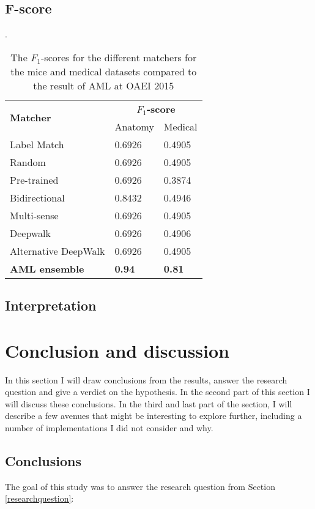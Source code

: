 \documentclass{article}
\begin{document}
  \subsection{F-score}
  \begin{table}[H]
  \caption[$F_1$]{The $F_1$-scores for the different matchers for the mice and medical datasets compared to the result of AML at OAEI 2015 \cite{oaei2015}}.
  \label{fscores}
  \begin{tabular}{l|ll}
  \multirow{2}{*}{\textbf{Matcher}} & \multicolumn{2}{c}{\textbf{$F_1$-score}} \\
  & Anatomy & Medical\\
  \hline
  Label Match & 0.6926 & 0.4905 \\
  Random & 0.6926 & 0.4905 \\
  Pre-trained & 0.6926 & 0.3874 \\
  Bidirectional & 0.8432 & 0.4946 \\
  Multi-sense & 0.6926 & 0.4905 \\
  Deepwalk & 0.6926 & 0.4906 \\
  Alternative DeepWalk & 0.6926 & 0.4905 \\
  \textbf{AML ensemble} & \textbf{0.94} & \textbf{0.81} \\
  \end{tabular}
  \end{table}
   
 \newpage
 \subsection{Interpretation}
 
  
 \newpage
 \section{Conclusion and discussion}
 In this section I will draw conclusions from the results, answer the research question and give a verdict on the hypothesis. In the second part of this section I will discuss these conclusions. In the third and last part of the section, I will describe a few avenues that might be interesting to explore further, including a number of implementations I did not consider and why.
 
 \subsection{Conclusions} \label{conclusions}
 The goal of this study was to answer the research question from Section \ref{researchquestion}:
\end{document}
